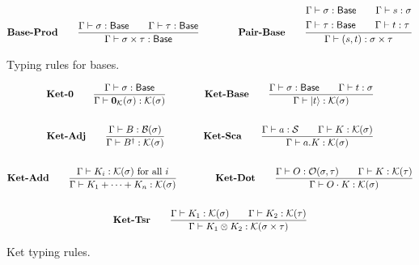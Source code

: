 \documentclass{article}
\begin{document}
\begin{figure}[h]
    \begin{gather*}
        \textbf{Base-Prod} \qquad
        \frac{\Gamma\vdash \sigma : \mathsf{Base} \qquad \Gamma\vdash \tau : \mathsf{Base}}{\Gamma\vdash \sigma \times \tau : \mathsf{Base}}
        \qquad \qquad
        \textbf{Pair-Base} \qquad
        \frac{
            \begin{aligned}
                & \Gamma\vdash \sigma : \mathsf{Base} \qquad \Gamma\vdash s : \sigma \\
                & \Gamma\vdash \tau : \mathsf{Base} \qquad \Gamma\vdash t : \tau
            \end{aligned}} {\Gamma\vdash (s, t) : \sigma \times \tau} 
        \textbf{}
    \end{gather*}
    \caption{Typing rules for bases. }
\end{figure}


\begin{figure}[h]
    \begin{gather*}
        \textbf{Ket-0} \qquad
        \frac{\Gamma \vdash \sigma : \mathsf{Base}}{\Gamma \vdash \mathbf{0}_\mathcal{K}(\sigma) : \mathcal{K}(\sigma)} 
        \qquad \qquad
        \textbf{Ket-Base} \qquad
        \frac{\Gamma \vdash \sigma : \mathsf{Base} \qquad \Gamma\vdash t : \sigma}{\Gamma \vdash \ket{t} : \mathcal{K}(\sigma)} \\
        \\
        \textbf{Ket-Adj} \qquad
        \frac{\Gamma \vdash B : \mathcal{B}(\sigma)}{\Gamma \vdash B^\dagger : \mathcal{K}(\sigma)} 
        \qquad \qquad
        \textbf{Ket-Sca} \qquad
        \frac{\Gamma \vdash a : \mathcal{S} \qquad \Gamma \vdash K : \mathcal{K}(\sigma)}{\Gamma \vdash a.K : \mathcal{K}(\sigma)} \\
        \\
        \textbf{Ket-Add} \qquad
        \frac{\Gamma \vdash K_i : \mathcal{K}(\sigma) \text{ for all $i$}}{\Gamma \vdash K_1 + \cdots + K_n : \mathcal{K}(\sigma)}
        \qquad \qquad
        \textbf{Ket-Dot} \qquad
        \frac{\Gamma \vdash O : \mathcal{O}(\sigma, \tau) \qquad \Gamma \vdash K : \mathcal{K}(\tau)}{\Gamma \vdash O \cdot K : \mathcal{K}(\sigma)} \\
        \\
        \textbf{Ket-Tsr} \qquad
        \frac{\Gamma \vdash K_1 : \mathcal{K}(\sigma) \qquad \Gamma \vdash K_2 : \mathcal{K}(\tau)} {\Gamma \vdash K_1 \otimes K_2 : \mathcal{K}(\sigma \times \tau)}
    \end{gather*}
    \caption{Ket typing rules.}
\end{figure}
\end{document}
